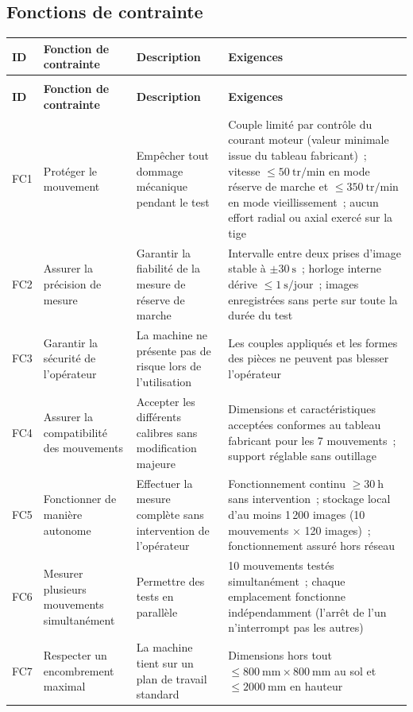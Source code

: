 \begin{landscape}
\newpage
\subsection{Fonctions de contrainte}

\label{tab:cahier-fc}
\begin{longtable}{|>{\raggedright\arraybackslash}p{1.5cm}|p{4cm}|p{6cm}|p{8cm}|}
\toprule
\textbf{ID} & \textbf{Fonction de contrainte} & \textbf{Description} & \textbf{Exigences} \\
\midrule
\endfirsthead

\multicolumn{4}{c}{\tablename\ \thetable{} (suite)} \\
\toprule
\textbf{ID} & \textbf{Fonction de contrainte} & \textbf{Description} & \textbf{Exigences} \\
\midrule
\endhead

\bottomrule
\endfoot

FC1 & Protéger le mouvement
    & Empêcher tout dommage mécanique pendant le test
    & Couple limité par contrôle du courant moteur (valeur minimale issue du tableau fabricant)~; vitesse $\leq 50\ \mathrm{tr/min}$ en mode réserve de marche et $\leq 350\ \mathrm{tr/min}$ en mode vieillissement~; aucun effort radial ou axial exercé sur la tige \\
\hline
FC2 & Assurer la précision de mesure
    & Garantir la fiabilité de la mesure de réserve de marche
    & Intervalle entre deux prises d'image stable à $\pm 30\ \mathrm{s}$~; horloge interne dérive $\leq 1\ \mathrm{s/jour}$~; images enregistrées sans perte sur toute la durée du test \\
\hline
FC3 & Garantir la sécurité de l'opérateur
    & La machine ne présente pas de risque lors de l'utilisation
    & Les couples appliqués et les formes des pièces ne peuvent pas blesser l'opérateur \\
\hline
FC4 & Assurer la compatibilité des mouvements
    & Accepter les différents calibres sans modification majeure
    & Dimensions et caractéristiques acceptées conformes au tableau fabricant pour les 7 mouvements~; support réglable sans outillage \\
\hline
FC5 & Fonctionner de manière autonome
    & Effectuer la mesure complète sans intervention de l'opérateur
    & Fonctionnement continu $\geq 30\ \mathrm{h}$ sans intervention~; stockage local d'au moins 1\,200 images (10 mouvements $\times$ 120 images)~; fonctionnement assuré hors réseau \\
\hline
FC6 & Mesurer plusieurs mouvements simultanément
    & Permettre des tests en parallèle
    & 10 mouvements testés simultanément~; chaque emplacement fonctionne indépendamment (l'arrêt de l'un n'interrompt pas les autres) \\
\hline
FC7 & Respecter un encombrement maximal
    & La machine tient sur un plan de travail standard
    & Dimensions hors tout $\leq 800\ \mathrm{mm} \times 800\ \mathrm{mm}$ au sol et $\leq 2000\ \mathrm{mm}$ en hauteur \\
\end{longtable}

\end{landscape}